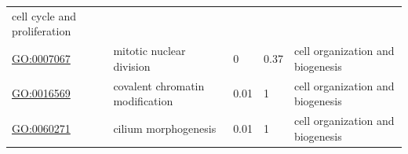 \documentclass[
]{article}
\begin{document}
\begin{longtable}[]{@{}lllll@{}}
\begin{minipage}[t]{0.17\columnwidth}
cell cycle and proliferation\strut
\end{minipage}\tabularnewline
\begin{minipage}[t]{0.17\columnwidth}\raggedright
\url{GO:0007067}\strut
\end{minipage} & \begin{minipage}[t]{0.17\columnwidth}\raggedright
mitotic nuclear division\strut
\end{minipage} & \begin{minipage}[t]{0.17\columnwidth}\raggedright
0\strut
\end{minipage} & \begin{minipage}[t]{0.17\columnwidth}\raggedright
0.37\strut
\end{minipage} & \begin{minipage}[t]{0.17\columnwidth}\raggedright
cell organization and biogenesis\strut
\end{minipage}\tabularnewline
\begin{minipage}[t]{0.17\columnwidth}\raggedright
\url{GO:0016569}\strut
\end{minipage} & \begin{minipage}[t]{0.17\columnwidth}\raggedright
covalent chromatin modification\strut
\end{minipage} & \begin{minipage}[t]{0.17\columnwidth}\raggedright
0.01\strut
\end{minipage} & \begin{minipage}[t]{0.17\columnwidth}\raggedright
1\strut
\end{minipage} & \begin{minipage}[t]{0.17\columnwidth}\raggedright
cell organization and biogenesis\strut
\end{minipage}\tabularnewline
\begin{minipage}[t]{0.17\columnwidth}\raggedright
\url{GO:0060271}\strut
\end{minipage} & \begin{minipage}[t]{0.17\columnwidth}\raggedright
cilium morphogenesis\strut
\end{minipage} & \begin{minipage}[t]{0.17\columnwidth}\raggedright
0.01\strut
\end{minipage} & \begin{minipage}[t]{0.17\columnwidth}\raggedright
1\strut
\end{minipage} & \begin{minipage}[t]{0.17\columnwidth}\raggedright
cell organization and biogenesis\strut

\end{minipage}
\end{longtable}
\end{document}
